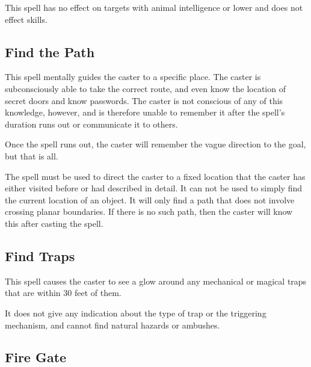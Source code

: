 \begin{multicols*}{2}
This spell has no effect on targets with animal intelligence or lower and does not effect  skills.

\subsection{Find the Path}\label{spell:Find the Path}

This spell mentally guides the caster to a specific place. The caster is subconsciously able to take the correct route, and even know the location of secret doors and know passwords. The caster is not conscious of any of this knowledge, however, and is therefore unable to remember it after the spell’s duration runs out or communicate it to others.

Once the spell runs out, the caster will remember the vague direction to the goal, but that is all.

The spell must be used to direct the caster to a fixed location that the caster has either visited before or had described in detail. It can not be used to simply find the current location of an object. It will only find a path that does not involve crossing planar boundaries. If there is no such path, then the caster will know this after casting the spell.

\subsection{Find Traps}\label{spell:Find Traps}

This spell causes the caster to see a glow around any mechanical or magical traps that are within 30 feet of them.

It does not give any indication about the type of trap or the triggering mechanism, and cannot find natural hazards or ambushes.

\subsection{Fire Gate}\label{spell:Fire Gate}
\end{multicols*}

